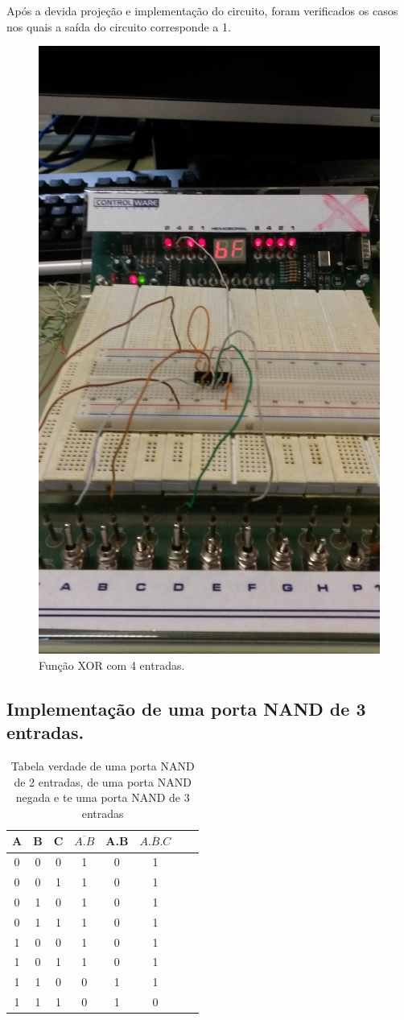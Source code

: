 \documentclass[12pt]{article}
\begin{document}
\begin{itemize}
	Após a devida projeção e implementação do circuito, foram verificados os casos nos quais a saída do circuito corresponde a 1.
	
	\begin{figure}[H]
		\centering
		\includegraphics[width=.5\textwidth]{circuitoxor2.jpg}
		\caption{Função XOR com 4 entradas.}
		\label{fig:exemplo}
	\end{figure}
	
\end{itemize}
 
\subsection{Implementação de uma porta NAND de 3 entradas.}
\label{sec:NAND}

\begin{table}[H]
	\centering
	\begin{tabular}{|c|c|c|c|c|c|c|c|}
		\cline{1-6}
		\caption{Tabela verdade de uma porta NAND de 2 entradas, de uma porta NAND negada e te uma porta NAND de 3 entradas}
		\multicolumn{1}{|c|}{A} & \multicolumn{1}{|c|}{B} & \multicolumn{1}{|c|}{C} & \multicolumn{1}{|c|}{$\overline{A.B}$} & \multicolumn{1}{|c|}{A.B} & \multicolumn{1}{|c|}{$\overline{A.B.C}$}\\
		\hline
		0 & 0 & 0 & 1 & 0 & 1\\
		0 & 0 & 1 & 1 & 0 & 1\\
		0 & 1 & 0 & 1 & 0 & 1\\
		0 & 1 & 1 & 1 & 0 & 1\\
		1 & 0 & 0 & 1 & 0 & 1\\
		1 & 0 & 1 & 1 & 0 & 1\\
		1 & 1 & 0 & 0 & 1 & 1\\
		1 & 1 & 1 & 0 & 1 & 0\\
		\hline
	\end{tabular}
	\label{Porta NAND}
\end{table}
\end{document}
